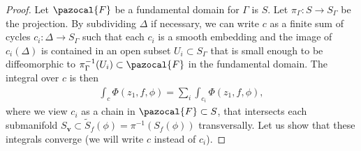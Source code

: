 \documentclass[twoside,a4paper,10pt]{article} %
\newcommand{\8}{\infty}
\newcommand{\vbf}{\mathbf{v}}
\newcommand{\Stil}{\widetilde{S}}
\newcommand{\Fcal}{\pazocal{F}}
\theoremstyle{mytheoremstyle}
\theoremstyle{remark}
\numberwithin{equation}{section}
\begin{document}
\begin{proof} Let $\Fcal$ be a fundamental domain for $\Gamma$ is $S$. Let $\pi_\Gamma \colon S \rightarrow S_\Gamma$ be the projection. By subdividing $\Delta$ if necessary, we can write $c$ as a finite sum of cycles $c_i \colon \Delta \longrightarrow S_\Gamma$ such that each $c_i$ is a smooth embedding and the image of $c_i(\Delta)$ is contained in an open subset $U_i \subset S_\Gamma$ that is small enough to be diffeomorphic to $\pi_\Gamma^{-1}(U_i) \subset \Fcal$ in the fundamental domain. The integral over $c$ is then
\begin{align}
\int_{c}\Phi(z_1,f,\phi)=\sum_i \int_{c_i} \Phi(z_1,f,\phi),
\end{align}
where we view $c_i$ as a chain in $\Fcal \subset S$, that intersects each submanifold $S_\vbf \subset \Stil_f(\phi)=\pi^{-1}(S_f(\phi))$ transversally. Let us show that these integrals converge (we will write $c$ instead of $c_i$).


\end{proof}
\end{document}
